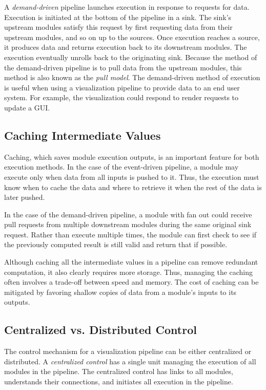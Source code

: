 \documentclass[journal,twocolumn,10pt,letterpaper,twoside]{IEEEtran}
\newcommand*{\keyterm}[1]{\emph{#1}}
\begin{document}
A \keyterm{demand-driven} pipeline launches execution in response to
requests for data.  Execution is initiated at the bottom of the pipeline in
a sink.  The sink's upstream modules satisfy this request by first
requesting data from their upstream modules, and so on up to the
sources.  Once execution reaches a source, it produces data and returns
execution back to its downstream modules.  The execution eventually
unrolls back to the originating sink.  Because the method of the
demand-driven pipeline is to pull data from the upstream modules, this
method is also known as the \keyterm{pull model}.  The demand-driven method
of execution is useful when using a visualization pipeline to provide data
to an end user system.  For example, the visualization could respond to render
requests to update a GUI.

\subsection{Caching Intermediate Values}
\label{sec:Caching}

Caching, which saves module execution outputs, is an important feature
for both execution methods.  In the case of the event-driven pipeline, a
module may execute only when data from all inputs is pushed to it.
Thus, the execution must know when to cache the data and where to retrieve
it when the rest of the data is later pushed.

In the case of the demand-driven pipeline, a module with fan out could
receive pull requests from multiple downstream modules during the same
original sink request.  Rather than execute multiple times, the module
can first check to see if the previously computed result is still valid and
return that if possible.

Although caching all the intermediate values in a pipeline can remove
redundant computation, it also clearly requires more storage.  Thus,
managing the caching often involves a trade-off between speed and memory.
The cost of caching can be mitigated by favoring shallow copies of data
from a module's inputs to its outputs.

\subsection{Centralized vs. Distributed Control}
\label{sec:CentralizedDistributed}

The control mechanism for a visualization pipeline can be either
centralized or distributed.  A \keyterm{centralized control} has a single
unit managing the execution of all modules in the pipeline.  The
centralized control has links to all modules, understands their
connections, and initiates all execution in the pipeline.
\end{document}

